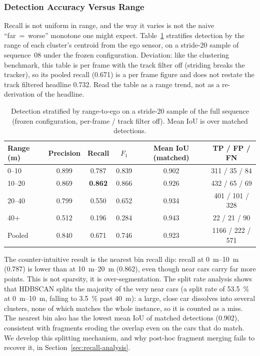 \documentclass[a4paper,12pt]{report}
\begin{document}
\subsubsection{Detection Accuracy Versus Range}
\label{sec:results-distance}

Recall is not uniform in range, and the way it varies is not the naive
``far~=~worse'' monotone one might expect. Table~\ref{tab:distance} stratifies
detection by the range of each cluster's centroid from the ego sensor, on a
stride-20 sample of sequence~08 under the frozen configuration.
Deviation: like the clustering benchmark, this table is
per frame with the track filter off (striding breaks the tracker), so its
pooled recall (\num{0.671}) is a per frame figure and does not restate the
track filtered headline \num{0.732}. Read the table as a range trend, not
as a re-derivation of the headline.

\begin{table}[H]
  \centering
  \caption[Detection stratified by range-to-ego]{Detection stratified by
    range-to-ego on a stride-20 sample of the full sequence (frozen configuration, per-frame /
    track filter off). Mean IoU is over matched detections.}
  \label{tab:distance}
  \begin{tabular}{lccccc}
    \toprule
    Range (m) & Precision & Recall & $F_1$ & Mean IoU (matched) & TP / FP / FN \\
    \midrule
    0--10   & 0.899 & 0.787 & 0.839 & 0.902 & \num{311} / \num{35}  / \num{84}  \\
    10--20  & 0.869 & \textbf{0.862} & 0.866 & 0.926 & \num{432} / \num{65}  / \num{69}  \\
    20--40  & 0.799 & 0.550 & 0.652 & 0.934 & \num{401} / \num{101} / \num{328} \\
    40+     & 0.512 & 0.196 & 0.284 & 0.943 & \num{22}  / \num{21}  / \num{90}  \\
    \midrule
    Pooled  & 0.840 & 0.671 & 0.746 & 0.923 & \num{1166} / \num{222} / \num{571} \\
    \bottomrule
  \end{tabular}
\end{table}

The counter-intuitive result is the nearest bin recall dip: recall at
\SIrange{0}{10}{\metre} (\num{0.787}) is lower than at
\SIrange{10}{20}{\metre} (\num{0.862}), even though near cars carry far more
points. This is not sparsity, it is over-segmentation. The split rate analysis shows
that HDBSCAN splits the majority of the very near cars (a split rate of
\SI{53.5}{\percent} at \SIrange{0}{10}{\metre}, falling to \SI{3.5}{\percent} past
\SI{40}{\metre}): a large, close car dissolves into several clusters,
none of which matches the whole instance, so it is counted as a miss. The nearest bin
also has the lowest mean IoU of matched detections (\num{0.902}),
consistent with fragments eroding the overlap even on the cars that do match. We
develop this splitting mechanism, and why post-hoc fragment merging fails to
recover it, in Section~\ref{sec:recall-analysis}.
\end{document}
